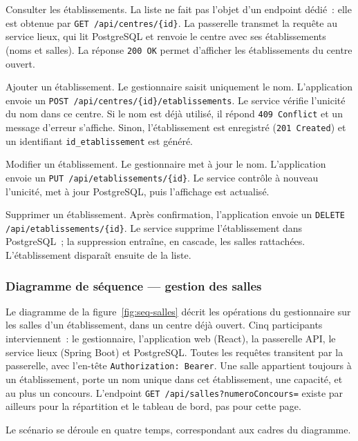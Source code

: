 \begin{onehalfspace}
Consulter les établissements. La liste ne fait pas l'objet d'un endpoint dédié~: elle est obtenue par \texttt{GET /api/centres/\{id\}}. La passerelle transmet la requête au service lieux, qui lit PostgreSQL et renvoie le centre avec ses établissements (noms et salles). La réponse \texttt{200 OK} permet d'afficher les établissements du centre ouvert.

Ajouter un établissement. Le gestionnaire saisit uniquement le nom. L'application envoie un \texttt{POST /api/centres/\{id\}/etablissements}. Le service vérifie l'unicité du nom dans ce centre. Si le nom est déjà utilisé, il répond \texttt{409 Conflict} et un message d'erreur s'affiche. Sinon, l'établissement est enregistré (\texttt{201 Created}) et un identifiant \texttt{id\_etablissement} est généré.

Modifier un établissement. Le gestionnaire met à jour le nom. L'application envoie un \texttt{PUT /api/etablissements/\{id\}}. Le service contrôle à nouveau l'unicité, met à jour PostgreSQL, puis l'affichage est actualisé.

Supprimer un établissement. Après confirmation, l'application envoie un \texttt{DELETE /api/etablissements/\{id\}}. Le service supprime l'établissement dans PostgreSQL~; la suppression entraîne, en cascade, les salles rattachées. L'établissement disparaît ensuite de la liste.

\subsubsection{Diagramme de séquence --- gestion des salles}

Le diagramme de la figure~\ref{fig:seq-salles} décrit les opérations du gestionnaire sur les salles d'un établissement, dans un centre déjà ouvert. Cinq participants interviennent~: le gestionnaire, l'application web (React), la passerelle API, le service lieux (Spring Boot) et PostgreSQL. Toutes les requêtes transitent par la passerelle, avec l'en-tête \texttt{Authorization: Bearer}. Une salle appartient toujours à un établissement, porte un nom unique dans cet établissement, une capacité, et au plus un concours. L'endpoint \texttt{GET /api/salles?numeroConcours=} existe par ailleurs pour la répartition et le tableau de bord, pas pour cette page.


Le scénario se déroule en quatre temps, correspondant aux cadres du diagramme.


\end{onehalfspace}

